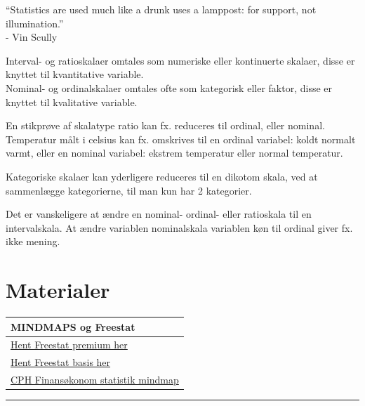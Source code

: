 \documentclass[]{book}
\begin{document}
``Statistics are used much like a drunk uses a lamppost: for support, not illumination.''\\
- Vin Scully

Interval- og ratioskalaer omtales som numeriske eller kontinuerte skalaer, disse er knyttet til kvantitative variable.\\
Nominal- og ordinalskalaer omtales ofte som kategorisk eller faktor, disse er knyttet til kvalitative variable.

En stikprøve af skalatype ratio kan fx. reduceres til ordinal, eller nominal. Temperatur målt i celsius kan fx. omskrives til en ordinal variabel: koldt normalt varmt, eller en nominal variabel: ekstrem temperatur eller normal temperatur.

Kategoriske skalaer kan yderligere reduceres til en dikotom skala, ved at sammenlægge kategorierne, til man kun har 2 kategorier.

Det er vanskeligere at ændre en nominal- ordinal- eller ratioskala til en intervalskala. At ændre variablen nominalskala variablen køn til ordinal giver fx. ikke mening.

\hypertarget{materialer}{%
\chapter{Materialer}\label{materialer}}

\begin{longtable}[]{@{}l@{}}
\toprule
MINDMAPS og Freestat\tabularnewline
\midrule
\endhead
\href{https://www.dropbox.com/s/a2jztexbxfzcli0/FREESTAT.xlsx?dl=1}{Hent Freestat premium her}\tabularnewline
\href{https://www.dropbox.com/s/th8q95lf864npie/FREESTATfin.xlsx?dl=1}{Hent Freestat basis her}\tabularnewline
\href{https://drive.google.com/uc?export=download\&id=0B1E7VnhxsDMlQ1Zhdjh5WTJ4bnM}{CPH Finansøkonom statistik mindmap}\tabularnewline
\bottomrule
\end{longtable}

\begin{center}\rule{0.5\linewidth}{\linethickness}\end{center}
\end{document}
